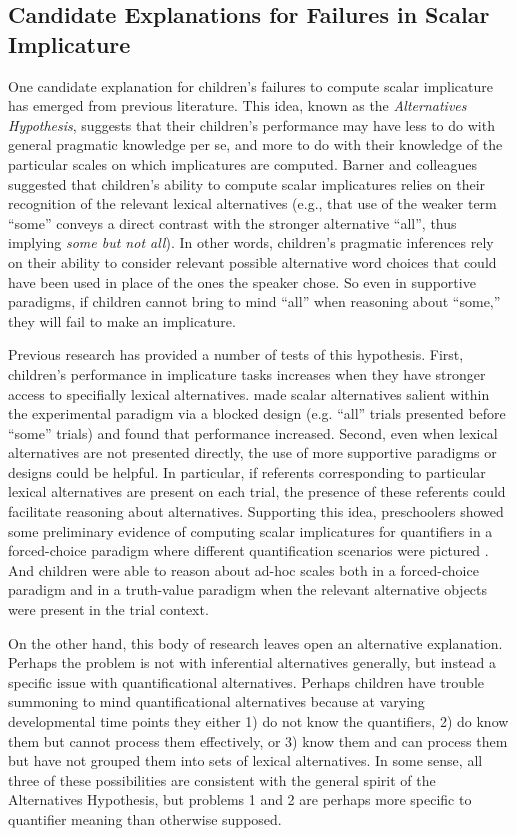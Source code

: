 \documentclass[man]{apa2}
\begin{document}
\subsection{Candidate Explanations for Failures in Scalar Implicature}

One candidate explanation for children's failures to compute scalar implicature has emerged from previous literature. This idea, known as the \emph{Alternatives Hypothesis}, suggests that their children's performance may have less to do with general pragmatic knowledge per se, and more to do with their knowledge of the particular scales on which implicatures are computed. Barner and colleagues \cite{barner2010, barner2011} suggested that children's ability to compute scalar implicatures relies on their recognition of the relevant lexical alternatives (e.g., that use of the weaker term ``some'' conveys a direct contrast with the stronger alternative ``all'', thus implying \emph{some but not all}).  In other words, children's pragmatic inferences rely on their ability to consider relevant possible alternative word choices that could have been used in place of the ones the speaker chose. So even in supportive paradigms, if children cannot bring to mind ``all'' when reasoning about ``some,'' they will fail to make an implicature.

Previous research has provided a number of tests of this hypothesis. First,  children's performance in implicature tasks increases when they have stronger access to specifially lexical alternatives.  made scalar alternatives salient within the experimental paradigm via a blocked design (e.g. ``all'' trials presented before ``some'' trials) and found that performance increased. Second, even when lexical alternatives are not presented directly, the use of more supportive paradigms or designs could be helpful. In particular, if referents corresponding to particular lexical alternatives are present on each trial, the presence of these referents could facilitate reasoning about alternatives. Supporting this idea, preschoolers showed some preliminary evidence of computing scalar implicatures for quantifiers in a forced-choice paradigm where different quantification scenarios were pictured \cite{miller2005}. And children were able to reason about ad-hoc scales both in a forced-choice paradigm \cite{stiller2015} and in a truth-value paradigm \cite{barner2011} when the relevant alternative objects were present in the trial context.

On the other hand, this body of research leaves open an alternative explanation. Perhaps the problem is not with inferential alternatives generally, but instead a specific issue with quantificational alternatives. Perhaps children have trouble summoning to mind quantificational alternatives because at varying developmental time points they either 1) do not know the quantifiers, 2) do know them but cannot process them effectively, or 3) know them and can process them but have not grouped them into sets of lexical alternatives. In some sense, all three of these possibilities are consistent with the general spirit of the Alternatives Hypothesis, but problems 1 and 2 are perhaps more specific to quantifier meaning than otherwise supposed.
\end{document}
